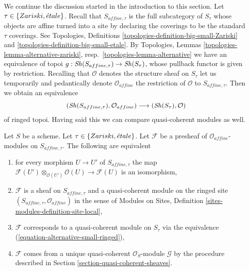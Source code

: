 \noindent
We continue the discussion started in the introduction to this section.
Let $\tau \in \{Zariski, {\acute{e}tale}\}$. Recall that $S_{affine, \tau}$
is the full subcategory of $S_\tau$ whose objects are affine turned
into a site by declaring the coverings to be the standard $\tau$
coverings. See Topologies, Definitions
\ref{topologies-definition-big-small-Zariski} and
\ref{topologies-definition-big-small-etale}.
By Topologies, Lemmas \ref{topologies-lemma-alternative-zariski},
resp.\  \ref{topologies-lemma-alternative}
we have an equivalence of topoi $g : \mathop{\mathit{Sh}}\nolimits(S_{affine, \tau}) \to \mathop{\mathit{Sh}}\nolimits(S_\tau)$,
whose pullback functor is given by restriction.
Recalling that $\mathcal{O}$ denotes the structure sheaf on
$S_\tau$ let us temporarily and pedantically denote
$\mathcal{O}_{affine}$ the restriction of $\mathcal{O}$ to
$S_{affine, \tau}$. Then we obtain an equivalence
\begin{equation}
\label{equation-alternative-small-ringed}
(\mathop{\mathit{Sh}}\nolimits(S_{affine, \tau}), \mathcal{O}_{affine})
\longrightarrow
(\mathop{\mathit{Sh}}\nolimits(S_\tau), \mathcal{O})
\end{equation}
of ringed topoi. Having said this we can compare quasi-coherent modules
as well.

\begin{lemma}
\label{lemma-quasi-coherent-alternative-small}
Let $S$ be a scheme. Let $\tau \in \{Zariski, {\acute{e}tale}\}$.
Let $\mathcal{F}$ be a presheaf of $\mathcal{O}_{affine}$-modules
on $S_{affine, \tau}$. The following are equivalent
\begin{enumerate}
\item for every morphism $U \to U'$ of $S_{affine, \tau}$ the map
$\mathcal{F}(U') \otimes_{\mathcal{O}(U')} \mathcal{O}(U) \to \mathcal{F}(U)$
is an isomorphism,
\item $\mathcal{F}$ is a sheaf on $S_{affine, \tau}$ and
a quasi-coherent module on the ringed site
$(S_{affine, \tau}, \mathcal{O}_{affine})$ in the sense of
Modules on Sites, Definition \ref{sites-modules-definition-site-local},
\item $\mathcal{F}$ corresponds to a quasi-coherent module on
$S_\tau$ via the equivalence (\ref{equation-alternative-small-ringed}),
\item $\mathcal{F}$ comes from a unique quasi-coherent
$\mathcal{O}_S$-module $\mathcal{G}$ by the procedure
described in Section \ref{section-quasi-coherent-sheaves}.
\end{enumerate}
\end{lemma}

